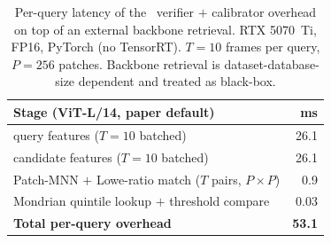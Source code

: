 \begin{table}[t]
\centering
\caption{Per-query latency of the \method\ verifier $+$ calibrator
overhead on top of an external backbone retrieval. RTX 5070~Ti, FP16,
PyTorch (no TensorRT). $T{=}10$ frames per query, $P{=}256$ patches.
Backbone retrieval is dataset-database-size dependent and treated as
black-box.}
\label{tab:runtime}
\footnotesize
\setlength{\tabcolsep}{4pt}
\begin{tabular}{l r}
\toprule
Stage (ViT-L/14, paper default) & ms \\
\midrule
\dinov{} query features ($T{=}10$ batched)       & 26.1 \\
\dinov{} candidate features ($T{=}10$ batched)   & 26.1 \\
Patch-MNN $+$ Lowe-ratio match ($T$ pairs, $P{\times}P$) & 0.9 \\
Mondrian quintile lookup $+$ threshold compare    & 0.03 \\
\midrule
\textbf{Total per-query overhead}                 & \textbf{53.1} \\
\bottomrule
\end{tabular}
\end{table}

